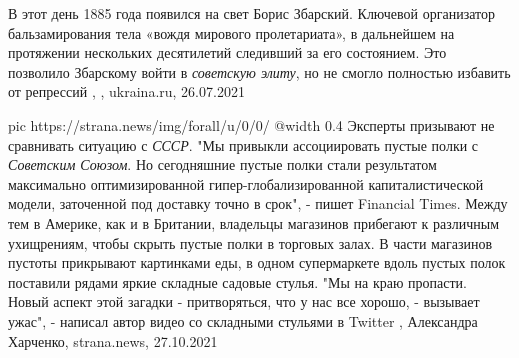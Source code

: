 В этот день 1885 года появился на свет Борис Збарский. Ключевой организатор
бальзамирования тела «вождя мирового пролетариата», в дальнейшем на протяжении
нескольких десятилетий следивший за его состоянием. Это позволило Збарскому
войти в \emph{советскую элиту}, но не смогло полностью избавить от репрессий
, 
, ukraina.ru, 26.07.2021

\ifcmt
  pic https://strana.news/img/forall/u/0/0/%
  @width 0.4
\fi
Эксперты призывают не сравнивать ситуацию с \emph{СССР}.  "Мы привыкли
ассоциировать пустые полки с \emph{Советским Союзом}. Но сегодняшние пустые
полки стали результатом максимально оптимизированной гипер-глобализированной
капиталистической модели, заточенной под доставку точно в срок", - пишет
Financial Times.  Между тем в Америке, как и в Британии, владельцы магазинов
прибегают к различным ухищрениям, чтобы скрыть пустые полки в торговых залах. В
части магазинов пустоты прикрывают картинками еды, в одном супермаркете вдоль
пустых полок поставили рядами яркие складные садовые стулья.  "Мы на краю
пропасти. Новый аспект этой загадки - притворяться, что у нас все хорошо, -
вызывает ужас", - написал автор видео со складными стульями в Twitter
, 
Александра Харченко, strana.news, 27.10.2021
